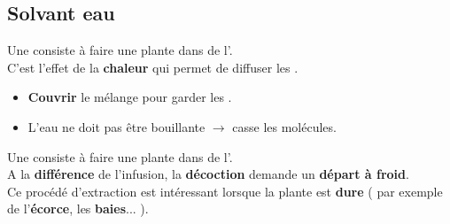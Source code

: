 \subsection{Solvant eau}


\begin{Defi}[Infusion]
	
	Une  consiste à faire  une plante dans de l'.\\

	C'est l'effet de la \textbf{chaleur} qui permet de diffuser les .
	
\end{Defi}



\begin{Remarque}
	\begin{itemize}[label = \faPen]
		\item \textbf{Couvrir} le mélange pour garder les .
		\item L'eau ne doit pas être bouillante $\longrightarrow$ casse les molécules.
	\end{itemize}
\end{Remarque}

\begin{Defi}[Décoction]
	
	Une  consiste à faire  une plante dans de l'.\\

	A la \textbf{différence} de l'infusion, la \textbf{décoction} demande un \textbf{départ à froid}. \\
	
	Ce procédé d'extraction est intéressant lorsque la plante est \textbf{dure} ( par exemple de l'\textbf{écorce}, les \textbf{baies}... ).

\end{Defi}

